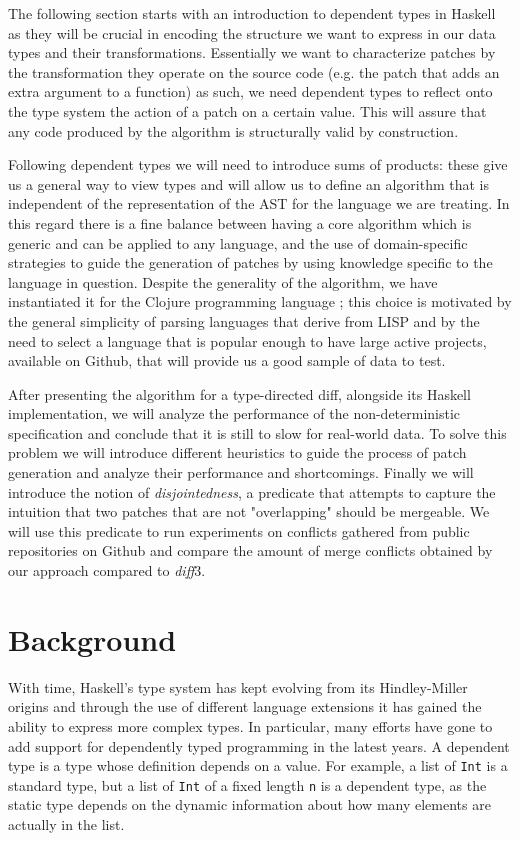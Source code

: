 \documentclass[11pt, titlepage]{article}
\newcommand{\toHaskell}[1]{\texttt{#1}\xspace}
\newcommand{\diff}{\emph{diff}}
\begin{document}
The following section starts with an introduction to dependent types in Haskell as they will be crucial in encoding the structure we want to express in our data types and their transformations. 
Essentially we want to characterize patches by the transformation they operate on the source code (e.g. the patch that adds an extra argument to a function) as such, we need dependent types to reflect onto the type system the action of a patch on a certain value. This will assure that any code produced by the algorithm is structurally valid by construction.

Following dependent types we will need to introduce sums of products: these give us a general way to view types and will allow us to define an algorithm that is independent of the representation of the AST for the language we are treating. In this regard there is a fine balance between having a core algorithm which is generic and can be applied to any language, and the use of domain-specific strategies to guide the generation of patches by using knowledge specific to the language in question.
Despite the generality of the algorithm, we have instantiated it for the Clojure programming language \cite{clojure}; this choice is motivated by the general simplicity of parsing languages that derive from LISP and by the need to select a language that is popular enough to have large 
active projects, available on Github, that will provide us a good sample of data to test.

After presenting the algorithm for a type-directed diff, alongside its Haskell implementation, we will analyze the performance of the non-deterministic specification and conclude that it is still to slow for real-world data. 
To solve this problem we will introduce different heuristics to guide the process of patch generation and analyze their performance and shortcomings.
Finally we will introduce the notion of \emph{disjointedness}, a predicate that attempts to capture the intuition that two patches that are not "overlapping" should be mergeable. We will use this predicate to run experiments on conflicts gathered from public repositories on Github and compare the amount of merge conflicts obtained by our approach compared to \diff3.

\section{Background}\label{dependent-types-in-haskell}

With time, Haskell's type system has kept evolving from its Hindley-Miller origins and through the use of different language extensions it has gained the ability to express more complex types. In particular, many efforts have gone to add support for dependently typed programming in the latest years. A dependent type is a type whose definition depends on a value. For example, a list of \toHaskell{Int} is a standard type, but a list of \toHaskell{Int} of a fixed length \toHaskell{n} is a dependent type, as the static type depends on the dynamic information about how many elements are actually in the list.
\end{document}
